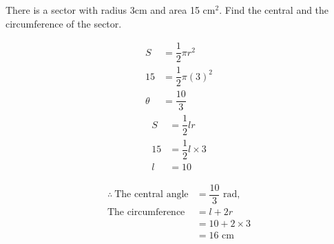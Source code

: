 \documentclass{report}
\begin{document}
\begin{question}
	There is a sector with radius 3cm and area 15 cm$^2$. Find the central and the circumference of the sector.
	
	\sol{}
	\vspace{-1em}
	\setlength{\columnsep}{-30em}
	\begin{multicols}{2}
		\vspace*{-2.6em}
		\begin{align*}
			S      & = \dfrac{1}{2}\pi r^2  \\
			15     & = \dfrac{1}{2}\pi(3)^2 \\
			\theta & = \dfrac{10}{3}        
		\end{align*}
		\begin{align*}
			S  & = \dfrac{1}{2}lr         \\
			15 & = \dfrac{1}{2}l \times 3 \\
			l  & = 10                     
		\end{align*}
	\end{multicols}
	\vspace{-4em}
	\begin{align*}
		\therefore\ \text{The central angle} & = \dfrac{10}{3} \text{ rad,} \\
		\text{The circumference}             & = l + 2r                     \\
		                                     & = 10 + 2 \times 3            \\
		                                     & = 16 \text{ cm}              
	\end{align*}
\end{question}
\newpage
\end{document}
